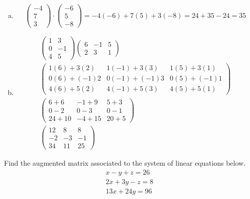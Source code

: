 \documentclass[12pt,letterpaper]{exam}
\begin{document}
\begin{questions}
\begin{enumerate}[(a)]
\item 
	\[
	\begin{pmatrix} -4 \\ 7 \\ 3 \end{pmatrix} \cdot \begin{pmatrix} -6 \\ 5 \\ -8 \end{pmatrix}= -4(-6) + 7(5) + 3(-8)= 24 + 35 - 24= 35
	\] \pspace

\item 
	\[
	\begin{gathered}
	\begin{pmatrix} 1 & 3 \\ 0 & -1 \\ 4 & 5 \end{pmatrix} \begin{pmatrix} 6 & -1 & 5 \\ 2 & 3 & 1 \end{pmatrix} \\[0.3cm]
	\begin{pmatrix} 
	1(6) + 3(2) & 1(-1) + 3(3) & 1(5) + 3(1) \\
	0(6) + (-1)2 & 0(-1) + (-1)3 & 0(5) + (-1)1 \\
	4(6) + 5(2) & 4(-1) + 5(3) & 4(5) + 5(1)
	\end{pmatrix} \\[0.3cm]
	\begin{pmatrix}
	6 + 6 & -1 + 9 & 5 + 3 \\
	0 - 2 & 0 - 3 & 0 - 1 \\
	24 + 10 & -4 + 15 & 20 + 5
	\end{pmatrix} \\[0.3cm]
	\begin{pmatrix}
	12 & 8 & 8 \\
	-2 & -3 & -1 \\
	34 & 11 & 25
	\end{pmatrix}
	\end{gathered}
	\]
\end{enumerate}



\newpage
\question[10] Find the augmented matrix associated to the system of linear equations below. 
	\[
	\begin{gathered}
	x - y + z= 26 \\
	2x + 3y - z= 8 \\
	13x + 24y= 96
	\end{gathered}
	\] \pspace


\end{questions}
\end{document}
